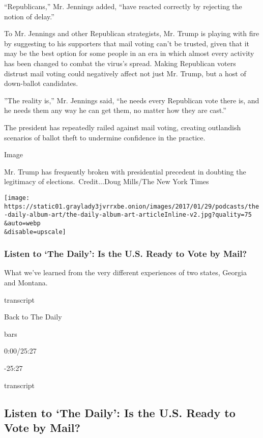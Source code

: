 ``Republicans,'' Mr. Jennings added, ``have reacted correctly by
rejecting the notion of delay.''

To Mr. Jennings and other Republican strategists, Mr. Trump is playing
with fire by suggesting to his supporters that mail voting can't be
trusted, given that it may be the best option for some people in an era
in which almost every activity has been changed to combat the virus's
spread. Making Republican voters distrust mail voting could negatively
affect not just Mr. Trump, but a host of down-ballot candidates.

''The reality is,'' Mr. Jennings said, ``he needs every Republican vote
there is, and he needs them any way he can get them, no matter how they
are cast.''

The president has repeatedly railed against mail voting, creating
outlandish scenarios of ballot theft to undermine confidence in the
practice.

Image

Mr. Trump has frequently broken with presidential precedent in doubting
the legitimacy of elections.~Credit...Doug Mills/The New York Times

\texttt{[image: https://static01.graylady3jvrrxbe.onion/images/2017/01/29/podcasts/the-daily-album-art/the-daily-album-art-articleInline-v2.jpg?quality=75\\\&auto=webp\\\&disable=upscale]}

\hypertarget{listen-to-the-daily-is-the-us-ready-to-vote-by-mail}{%
\subsubsection{Listen to `The Daily': Is the U.S. Ready to Vote by
Mail?}\label{listen-to-the-daily-is-the-us-ready-to-vote-by-mail}}

What we've learned from the very different experiences of two states,
Georgia and Montana.

transcript

Back to The Daily

bars

0:00/25:27

-25:27

transcript

\hypertarget{listen-to-the-daily-is-the-us-ready-to-vote-by-mail-1}{%
\subsection{Listen to `The Daily': Is the U.S. Ready to Vote by
Mail?}\label{listen-to-the-daily-is-the-us-ready-to-vote-by-mail-1}}

